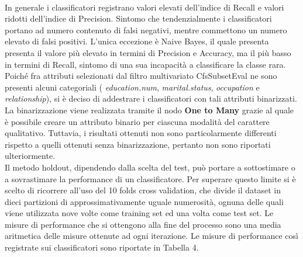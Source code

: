 \documentclass[fleqn,10pt]{SelfArx}
\begin{document}
\\
In generale i classificatori registrano valori elevati dell'indice di Recall e valori ridotti dell'indice di Precision. Sintomo che tendenzialmente i classificatori portano ad numero contenuto di falsi negativi, mentre commettono un numero elevato di falsi positivi. L'unica eccezione è Naive Bayes, il quale presenta presenta il valore più elevato in termini di Precision e Accuracy, ma il più basso in termini di Recall, sintomo di una sua incapacità a classificare la classe rara.
\\
Poiché fra attributi selezionati dal filtro multivariato CfsSubsetEval ne sono presenti alcuni categoriali ( \textit{education.num}, \textit{marital.status}, \textit{occupation} e \textit{relationship}), si è deciso di addestrare i classificatori con tali attributi binarizzati. La binarizzazione viene realizzata tramite il nodo \textbf{One to Many} grazie al quale è possibile creare un attributo binario per ciascuna modalità del carattere qualitativo. Tuttavia, i risultati ottenuti non sono particolarmente differenti rispetto a quelli ottenuti senza binarizzazione, pertanto non sono riportati ulteriormente.
\\
Il metodo holdout, dipendendo dalla scelta del test, può portare a sottostimare o a sovrastimare la performance di un classificatore. Per superare questo limite si è scelto di ricorrere all'uso del 10 folds cross validation, che divide il dataset in dieci partizioni di approssimativamente uguale numerosità, ognuna delle quali viene utilizzata nove volte come training set ed una volta come test set. Le misure di performance che si ottengono alla fine del processo sono una media aritmetica delle misure ottenute ad ogni iterazione.
Le misure di performance così registrate sui classificatori sono riportate in Tabella 4.
\begin{table}[h!]
\caption{Equal size sampling con CfsSubsetEval e Cross Validation}
\label{table:holdout}
\end{table}
\end{document}
